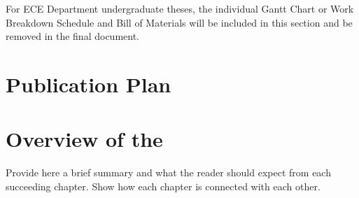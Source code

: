 For ECE Department undergraduate theses, the individual Gantt Chart or Work Breakdown Schedule and Bill of Materials will be included in this section and be removed in the final document.

\graytx{\blindtext}

\ifPhD
\section{Publication Plan}
\graytx{\blindtext}
\fi

\fi


\section{Overview of the \documentType}

Provide here a brief summary and what the reader should expect from each succeeding chapter.  Show how each chapter is connected with each other.


